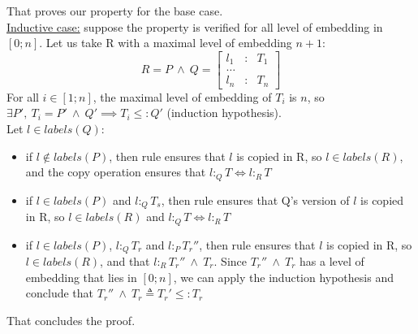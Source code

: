 \documentclass[11pt]{article}
\begin{document}
\begin{appendices}
				That proves our property for the base case.\\
				\underline{Inductive case:} suppose the property is verified for all level of embedding in $[0;n]$. Let us take R with a maximal level of embedding $n+1$:
				\begin{equation*}
					R = P \ \boxed{\wedge} \ Q = \left[\begin{array}{lll}
					l_1 &:& T_1\\
					\dots\\
					l_n &:& T_n
					\end{array}\right]
				\end{equation*}
				For all $i \in [1; n]$, the maximal level of embedding of $T_i$ is $n$, so $\exists P', \ T_i = P' \ \boxed{\wedge} \ Q' \implies T_i \leq: Q'$ (induction hypothesis).\\
				Let $l \in labels(Q)$:
				\begin{itemize}
					\item if $l \notin labels(P)$, then rule  ensures that $l$ is copied in R, so $l \in labels(R)$, and the copy operation ensures that $l :_{Q} T \iff l :_R T$
					\item if $l \in labels(P)$ and $l :_Q T_s$, then rule  ensures that Q's version of $l$ is copied in R, so $l \in labels(R)$ and $l :_Q T \iff l:_R T$ 
					\item if $l \in labels(P)$, $l :_Q T_r$ and $l :_P T_r''$, then rule  ensures that $l$ is copied in R, so $l \in labels(R)$, and that $l :_R T_r'' \ \boxed{\wedge} \ T_r$. Since $T_r'' \ \boxed{\wedge} \ T_r$ has a level of embedding that lies in $[0; n]$, we can apply the induction hypothesis and conclude that  $T_r'' \ \boxed{\wedge} \ T_r \triangleq T_r' \leq: T_r$
				\end{itemize}
				That concludes the proof.
			
			
\end{appendices}
\end{document}

